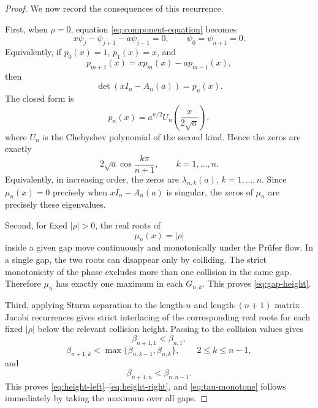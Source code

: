 \documentclass[11pt]{amsart}
\numberwithin{equation}{section}
\begin{document}
\begin{proof}
We now record the consequences of this recurrence.

First, when \(\rho=0\), equation \eqref{eq:component-equation} becomes
\begin{equation}\label{eq:rho-zero-recurrence}
x\psi_j-\psi_{j+1}-a \psi_{j-1}=0,
\qquad
\psi_0=\psi_{n+1}=0.
\end{equation}
Equivalently, if \(p_0(x)=1\), \(p_1(x)=x\), and
\begin{equation}\label{eq:polynomial-recurrence}
p_{m+1}(x)=xp_m(x)-a p_{m-1}(x),
\end{equation}
then
\begin{equation}\label{eq:determinant-polynomial}
\det(xI_n-A_n(a))=p_n(x).
\end{equation}
The closed form is
\begin{equation}\label{eq:chebyshev-form}
p_n(x)
=
a^{n/2}
U_n\!\left(\frac{x}{2\sqrt a}\right),
\end{equation}
where \(U_n\) is the Chebyshev polynomial of the second kind.  Hence the zeros are exactly
\begin{equation}\label{eq:chebyshev-zeros}
2\sqrt a\cos\frac{k\pi}{n+1},
\qquad k=1,\dots,n.
\end{equation}
Equivalently, in increasing order, the zeros are \(\lambda_{n,k}(a)\), \(k=1,\dots,n\).  Since \(\mu_n(x)=0\) precisely when \(xI_n-A_n(a)\) is singular, the zeros of \(\mu_n\) are precisely these eigenvalues.

Second, for fixed \(|\rho|>0\), the real roots of
\begin{equation}\label{eq:level-equation}
\mu_n(x)=|\rho|
\end{equation}
inside a given gap move continuously and monotonically under the Pr\"ufer flow.  In a single gap, the two roots can disappear only by colliding.  The strict monotonicity of the phase excludes more than one collision in the same gap.  Therefore \(\mu_n\) has exactly one maximum in each \(G_{n,k}\).  This proves \eqref{eq:gap-height}.

Third, applying Sturm separation to the length-\(n\) and length-\((n+1)\) matrix Jacobi recurrences gives strict interlacing of the corresponding real roots for each fixed \(|\rho|\) below the relevant collision height.  Passing to the collision values gives
\[
\beta_{n+1,1}<\beta_{n,1},
\]
\[
\beta_{n+1,k}<\max\{\beta_{n,k-1},\beta_{n,k}\},
\qquad 2\le k\le n-1,
\]
and
\[
\beta_{n+1,n}<\beta_{n,n-1}.
\]
This proves \eqref{eq:height-left}--\eqref{eq:height-right}, and \eqref{eq:tau-monotone} follows immediately by taking the maximum over all gaps.


\end{proof}
\end{document}
